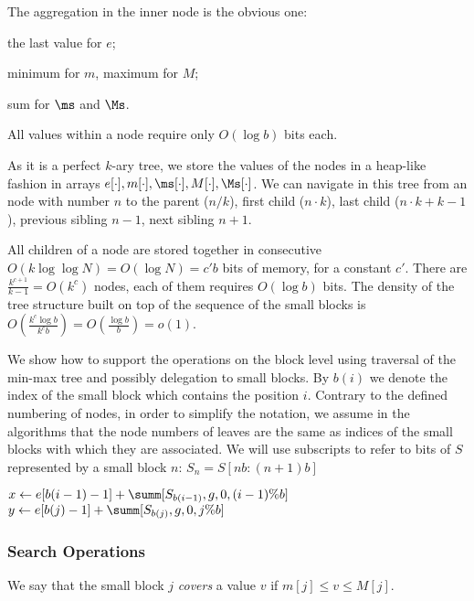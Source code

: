 The aggregation in the inner node is the obvious one:
\begin{iteminline}
	\item the last value for $e$;
	\item minimum for $m$, maximum for $M$;
	\item sum for $\ms$ and $\Ms$.
\end{iteminline}
All values within a node require only $O(\log b)$ bits each.

As it is a perfect $k$-ary tree, we store the values of the nodes in a heap-like fashion in arrays $e[\cdot], m[\cdot], \ms[\cdot], M[\cdot], \Ms[\cdot]$.
We can navigate in this tree from an node with number $n$ to the parent ($n / k$), first child ($n \cdot k$), last child ($n \cdot k + k - 1$), previous sibling $n - 1$, next sibling $n + 1$.

All children of a node are stored together in consecutive $O(k \log \log N) = O(\log N) = c' b$ bits of memory, for a constant $c'$.
There are $\frac{k^{c + 1}}{k - 1} = O(k^c)$ nodes, each of them requires $O(\log b)$ bits.
The density of the tree structure built on top of the sequence of the small blocks is $O(\frac{k^c \log b}{k^c b}) = O(\frac{\log b}{b}) = o(1)$.

\bigskip

We show how to support the operations on the block level using traversal of the min-max tree and possibly delegation to small blocks.
By $b(i)$ we denote the index of the small block which contains the position $i$.
Contrary to the defined numbering of nodes, in order to simplify the notation, we assume in the algorithms that the node numbers of leaves are the same as indices of the small blocks with which they are associated.
We will use subscripts to refer to bits of $S$ represented by a small block $n$: $S_n = S[n b : (n + 1) b]$

\begin{algorithmic}
	\State $x \gets e[b(i - 1) - 1] + \summ[S_{b(i - 1)}, g, 0, (i - 1) \% b]$
	\State $y \gets e[b(j) - 1] + \summ[S_{b(j)}, g, 0, j \% b]$
	\State {}
\EndFunction
\end{algorithmic}

\subsubsection{Search Operations}

We say that the small block $j$ \emph{covers} a value $v$ if $m[j] \le v \le M[j]$.


